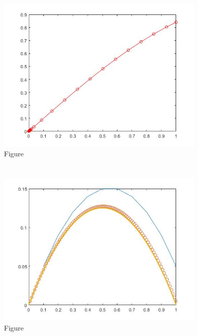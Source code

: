 \documentclass{article}
\begin{document}
        \subsection{}
            
            \begin{figure}[H] 
                \centering 
                \includegraphics[width=0.9\textwidth]{img/Assignement_7_5.jpg}
                \caption{Figure} 
            \end{figure}
    \section{}
        \subsection{}
            
        \subsection{}
            \begin{figure}[H] 
                \centering 
                \includegraphics[width=0.9\textwidth]{img/Assignement_7_4.jpg}
                \caption{Figure} 
            \end{figure}
\end{document}

